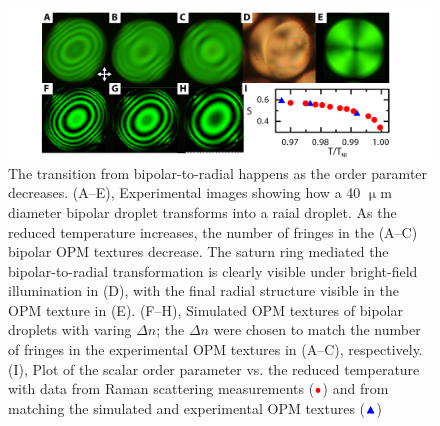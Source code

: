 \begin{figure}
  \centering
  \includegraphics{figures/C7/Ch7-Figs_Emulsion_Trans.png}
  \caption{The transition from bipolar-to-radial happens as the order paramter decreases.
    (A--E), Experimental images showing how a 40 $\upmu$m diameter bipolar droplet transforms into a raial droplet.
    As the reduced temperature increases, the number of fringes in the (A--C) bipolar OPM textures decrease.
    The saturn ring mediated the bipolar-to-radial transformation is clearly visible under bright-field illumination in (D), with the final radial structure visible in the OPM texture in (E).
    (F--H), Simulated OPM textures of bipolar droplets with varing $\Delta n$; the $\Delta n$ were chosen to match the number of fringes in the experimental OPM textures in (A--C), respectively.
    (I), Plot of the scalar order parameter vs. the reduced temperature with data from Raman scattering measurements (${\color{red} \bullet}$) and from matching the simulated and experimental OPM textures (${\color{blue} \blacktriangle}$)
     }\label{f:7-Emulsion_Trans}
\end{figure}

